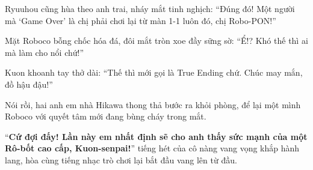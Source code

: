 \documentclass[../main.tex]{subfiles}
\begin{document}
Ryuuhou cũng hùa theo anh trai, nháy mắt tinh nghịch: ``Đúng đó! Một người mà `Game Over' là chị phải chơi lại từ màn 1-1 luôn đó, chị Robo-PON!''

Mặt Roboco bỗng chốc hóa đá, đôi mắt tròn xoe đầy sững sờ: ``Ể!? Khó thế thì ai mà làm cho nổi chứ!''

Kuon khoanh tay thở dài: ``Thế thì mới gọi là True Ending chứ. Chúc may mắn, đồ hậu đậu!''

Nói rồi, hai anh em nhà Hikawa thong thả bước ra khỏi phòng, để lại một mình Roboco với quyết tâm mới đang bùng cháy trong mắt.

``\textbf{Cứ đợi đấy! Lần này em nhất định sẽ cho anh thấy sức mạnh của một Rô-bốt cao cấp, Kuon-senpai!}'' tiếng hét của cô nàng vang vọng khắp hành lang, hòa cùng tiếng nhạc trò chơi lại bắt đầu vang lên từ đầu.
\end{document}
